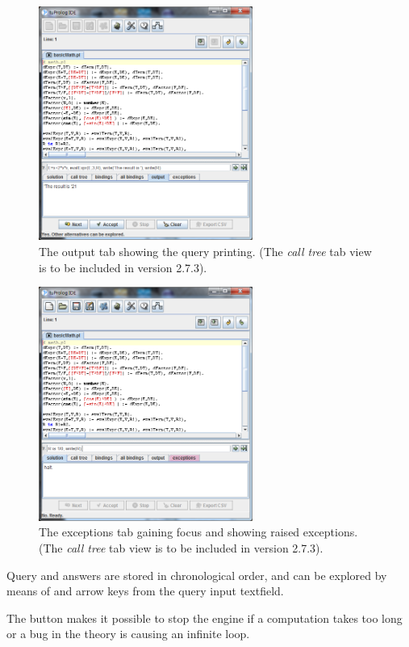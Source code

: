 \begin{figure}
\centering
\includegraphics[width=7cm]{images/gui-output}
\caption{The output tab showing the query printing.
(The \textit{call tree} tab view is to be included in version 2.7.3).}
\label{fig:gui-output}
\end{figure}

\begin{figure}
\centering
\includegraphics[width=7cm]{images/gui-exceptions}
\caption{The exceptions tab gaining focus and showing raised exceptions.
(The \textit{call tree} tab view is to be included in version 2.7.3).}
\label{fig:gui-exceptions}
\end{figure}
Query and answers are stored in chronological order, and can be explored by means of  and  arrow keys from the query input textfield.

The  button makes it possible to stop the engine if a computation takes too long or a bug in the theory is causing an infinite loop.

